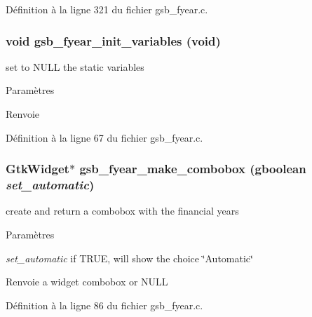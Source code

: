 Définition à la ligne 321 du fichier gsb\_\-fyear.c.

\subsubsection[{gsb\_\-fyear\_\-init\_\-variables}]{\setlength{\rightskip}{0pt plus 5cm}void gsb\_\-fyear\_\-init\_\-variables (void)}\label{gsb__fyear_8c_ac8924e7fc78d895c0611fdaa4580a6f2}
set to NULL the static variables


\begin{DoxyParams}{Paramètres}
\item[{\em }]\end{DoxyParams}
\begin{DoxyReturn}{Renvoie}

\end{DoxyReturn}


Définition à la ligne 67 du fichier gsb\_\-fyear.c.

\subsubsection[{gsb\_\-fyear\_\-make\_\-combobox}]{\setlength{\rightskip}{0pt plus 5cm}GtkWidget$\ast$ gsb\_\-fyear\_\-make\_\-combobox (gboolean {\em set\_\-automatic})}\label{gsb__fyear_8c_a6f8ef344dde2ca4102a8371319b7565e}
create and return a combobox with the financial years


\begin{DoxyParams}{Paramètres}
\item[{\em set\_\-automatic}]if TRUE, will show the choice \char`\"{}Automatic\char`\"{}\end{DoxyParams}
\begin{DoxyReturn}{Renvoie}
a widget combobox or NULL 
\end{DoxyReturn}


Définition à la ligne 86 du fichier gsb\_\-fyear.c.

